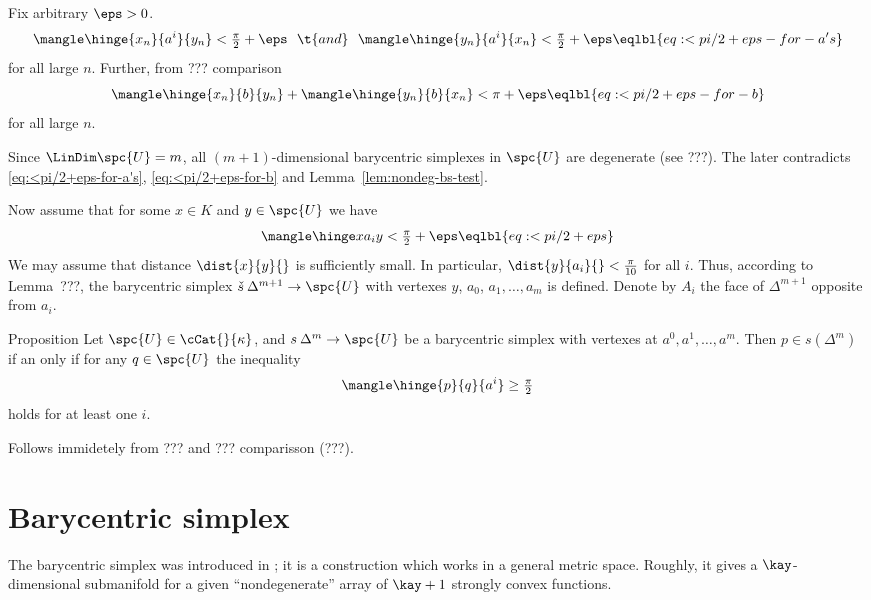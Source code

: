 Fix arbitrary $\eps>0$.
$$\mangle\hinge{x_n}{a^i}{y_n}<\tfrac\pi2+\eps
\ \ 
\t{and}
\ \  
\mangle\hinge{y_n}{a^i}{x_n}<\tfrac\pi2+\eps
\eqlbl{eq:<pi/2+eps-for-a's}$$
for all large $n$.
Further, from ??? comparison
$$\mangle\hinge{x_n}{b}{y_n}+\mangle\hinge{y_n}{b}{x_n}<\pi+\eps
\eqlbl{eq:<pi/2+eps-for-b}$$
for all large $n$.

Since $\LinDim\spc{U}=m$,
all $(m+1)$-dimensional barycentric simplexes in $\spc{U}$ are degenerate (see ???).
The later contradicts \ref{eq:<pi/2+eps-for-a's}, \ref{eq:<pi/2+eps-for-b} and Lemma~\ref{lem:nondeg-bs-test}.









Now assume that for some $x\in K$ and $y\in \spc{U}$ we have 
$$\mangle\hinge x{a_i}y<\tfrac\pi2+\eps\eqlbl{eq:<pi/2+eps}$$
We may assume that distance $\dist{x}{y}{}$ is sufficiently small.
In particular, $\dist{y}{a_i}{}<\tfrac\pi{10}$ for all $i$.
Thus, according to Lemma~???,
the barycentric simplex $\check s\:\Delta^{m+1}\to\spc{U}$ 
with vertexes $y$, $a_0$, $a_1,\dots,a_m$ is defined.
Denote by $A_i$ the face of $\Delta^{m+1}$ opposite from $a_i$.










\begin{thm}{Proposition}\label{prop:in-bary-cba}
Let $\spc{U}\in\cCat{}{\kappa}$,
and $s\:\Delta^m\to \spc{U}$ be a barycentric simplex
with vertexes at $a^0,a^1,\dots,a^m$.
Then $p\in s(\Delta^m)$ if an only if 
for any $q\in \spc{U}$ the inequality
$$\mangle\hinge{p}{q}{a^i}\ge\tfrac\pi2$$
holds for at least one $i$.
\end{thm}

Follows immidetely from ??? and ??? comparisson (???).
\qeds







\section{Barycentric simplex}\label{sec:barycentric}



The barycentric simplex was introduced in \cite{kleiner};
it is a construction which works in a general metric space.
Roughly, it gives a $\kay$-\nospace dimensional submanifold for a given ``nondegenerate'' array of $\kay+1$ strongly convex functions.

